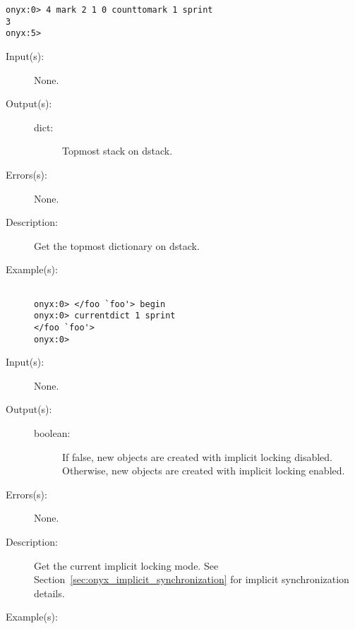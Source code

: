 \begin{description}
\begin{description}
\begin{verbatim}
onyx:0> 4 mark 2 1 0 counttomark 1 sprint
3
onyx:5>
		\end{verbatim}
	\end{description}
\label{systemdict:currentdict}
\item[{\onyxop{--}{currentdict}{dict}}: ]
	\begin{description}\item[]
	\item[Input(s): ] None.
	\item[Output(s): ]
		\begin{description}\item[]
		\item[dict: ]
			Topmost stack on dstack.
		\end{description}
	\item[Errors(s): ] None.
	\item[Description: ]
		Get the topmost dictionary on dstack.
	\item[Example(s): ]\begin{verbatim}

onyx:0> </foo `foo'> begin 
onyx:0> currentdict 1 sprint
</foo `foo'>
onyx:0>
		\end{verbatim}
	\end{description}
\label{systemdict:currentlocking}
\item[{\onyxop{--}{currentlocking}{boolean}}: ]
	\begin{description}\item[]
	\item[Input(s): ] None.
	\item[Output(s): ]
		\begin{description}\item[]
		\item[boolean: ]
			If false, new objects are created with implicit locking
			disabled.  Otherwise, new objects are created with
			implicit locking enabled.
		\end{description}
	\item[Errors(s): ] None.
	\item[Description: ]
		Get the current implicit locking mode.  See
		Section~\ref{sec:onyx_implicit_synchronization} for implicit
		synchronization details.
	\item[Example(s): ]\begin{verbatim}


\end{verbatim}
\end{description}
\end{description}
